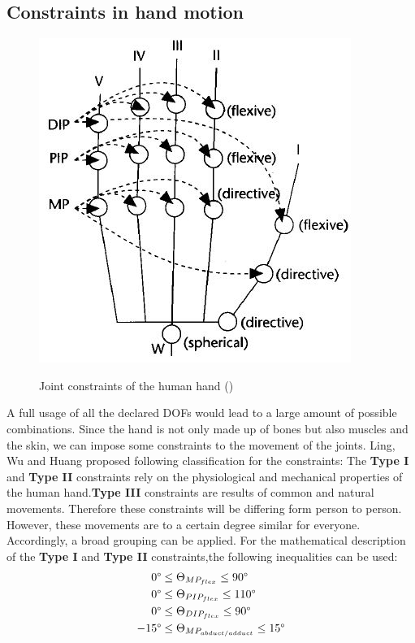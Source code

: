 \subsection{Constraints in hand motion}
\begin{figure}[ht]
\centering
	\includegraphics[width=\columnwidth/2]{images/Hand_DOFs.JPG}
	\label{Handstructure} 
	\caption{Joint constraints of the human hand (\cite{LEE.1995})}
\end{figure}
A full usage of all the declared DOFs would lead to a large amount of possible combinations. Since the hand is not only made up of bones but also muscles and the skin, we can impose some constraints \cite{Badler.1987,Pavlovic.1997} to the movement of the joints. Ling, Wu and Huang\cite{LIN.2000} proposed following classification for the constraints:
The \textbf{Type I} and \textbf{Type II} constraints rely on the physiological and mechanical properties of the human hand.\textbf{Type III} constraints are results of common and natural movements. Therefore these constraints will be differing form person to person. However, these movements are to a certain degree similar for everyone. Accordingly, a broad grouping can be applied. For the mathematical description of the \textbf{Type I} and \textbf{Type II} constraints,the following inequalities can be used:
\begin{equation}
\begin{split}
0\degree&\leq \Theta _{MP_{flex}} \leq 90\degree\\
0\degree&\leq \Theta _{PIP_{flex}} \leq 110\degree\\
0\degree&\leq \Theta _{DIP_{flex}} \leq 90\degree\\
-15\degree&\leq \Theta _{MP_{abduct/adduct}} \leq 15\degree
\end{split}
\end{equation}

